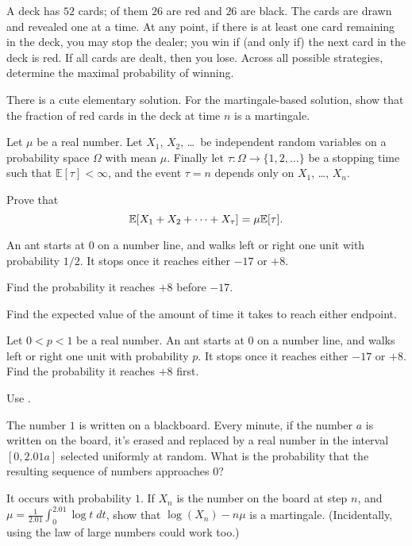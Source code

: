 \begin{problem}
	A deck has $52$ cards; of them $26$ are red and $26$ are black.
	The cards are drawn and revealed one at a time.
	At any point, if there is at least one card remaining in the deck,
	you may stop the dealer;
	you win if (and only if) the next card in the deck is red.
	If all cards are dealt, then you lose.
	Across all possible strategies,
	determine the maximal probability of winning.
	\begin{hint}
		There is a cute elementary solution.
		For the martingale-based solution,
		show that the fraction of red cards in the deck at time $n$ is a martingale.
	\end{hint}
\end{problem}

\begin{problem}
	Let $\mu$ be a real number.
	Let $X_1$, $X_2$, \dots\ be independent random variables
	on a probability space $\Omega$ with mean $\mu$.
	Finally let $\tau \colon \Omega \to \{1, 2, \dots\}$
	be a stopping time such that $\mathbb E[\tau] < \infty$,
	and the event $\tau = n$ depends only on $X_1$, \dots, $X_n$.

	Prove that
	\[ \mathbb E[X_1 + X_2 + \dots + X_\tau] = \mu \mathbb E[\tau]. \]
\end{problem}

\begin{problem}
	An ant starts at $0$ on a number line,
	and walks left or right one unit with probability $1/2$.
	It stops once it reaches either $-17$ or $+8$.
	\begin{enumerate}[(a)]
		\ii Find the probability it reaches $+8$ before $-17$.

		\ii Find the expected value of the amount of time
		it takes to reach either endpoint.
	\end{enumerate}
\end{problem}

\begin{problem}
	Let $0 < p < 1$ be a real number.
	An ant starts at $0$ on a number line,
	and walks left or right one unit with probability $p$.
	It stops once it reaches either $-17$ or $+8$.
	Find the probability it reaches $+8$ first.
	\begin{hint}
		Use .
	\end{hint}
\end{problem}

\begin{problem}
	The number $1$ is written on a blackboard.
	Every minute, if the number $a$ is written on the board,
	it's erased and replaced by a real number
	in the interval $[0, 2.01a]$ selected uniformly at random.
	What is the probability that the resulting sequence of numbers approaches $0$?
	\begin{hint}
		It occurs with probability $1$.
		If $X_n$ is the number on the board at step $n$,
		and $\mu = \frac{1}{2.01} \int_0^{2.01} \log t \; dt$,
		show that $\log(X_n) - n \mu$ is a martingale.
		(Incidentally, using the law of large numbers could work too.)
	\end{hint}
\end{problem}
